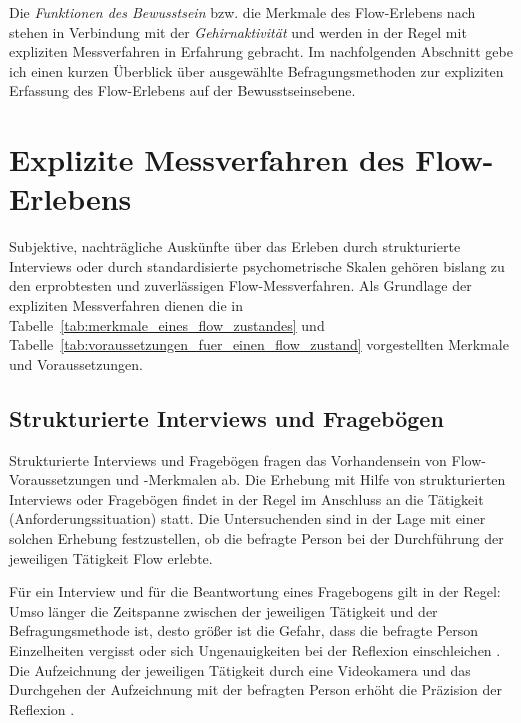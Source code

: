 Die \emph{Funktionen des Bewusstsein} bzw. die Merkmale des Flow-Erlebens nach \citet{Henk2014} stehen in Verbindung mit der \emph{Gehirnaktivität} und werden in der Regel mit expliziten Messverfahren in Erfahrung gebracht. Im nachfolgenden Abschnitt gebe ich einen kurzen Überblick über ausgewählte Befragungsmethoden zur expliziten Erfassung des Flow-Erlebens auf der Bewusstseinsebene. 


\section{Explizite Messverfahren des Flow-Erlebens} %
\label{sec:explizite_messverfahren_des_flow_erlebens}

Subjektive, nachträgliche Auskünfte über das Erleben durch strukturierte Interviews oder durch standardisierte psychometrische Skalen gehören bislang zu den erprobtesten und zuverlässigen Flow-Messverfahren. Als Grundlage der expliziten Messverfahren dienen die in Tabelle~\ref{tab:merkmale_eines_flow_zustandes} und Tabelle~\ref{tab:voraussetzungen_fuer_einen_flow_zustand} vorgestellten Merkmale und Voraussetzungen.

\subsection{Strukturierte Interviews und Fragebögen} %
\label{sub:strukturierte_interviews_und_fragebogen}

Strukturierte Interviews und Fragebögen fragen das Vorhandensein von Flow-Voraussetzungen und -Merkmalen ab. Die Erhebung mit Hilfe von strukturierten Interviews oder Fragebögen findet in der Regel im Anschluss an die Tätigkeit (Anforderungssituation) statt. Die Untersuchenden sind in der Lage mit einer solchen Erhebung festzustellen, ob die befragte Person bei der Durchführung der jeweiligen Tätigkeit Flow erlebte.

Für ein Interview und für die Beantwortung eines Fragebogens gilt in der Regel: Umso länger die Zeitspanne zwischen der jeweiligen Tätigkeit und der Befragungsmethode ist, desto größer ist die Gefahr, dass die befragte Person Einzelheiten vergisst oder sich Ungenauigkeiten bei der Reflexion einschleichen \citep[][S.~87]{Henk2014}. Die Aufzeichnung der jeweiligen Tätigkeit durch eine Videokamera und das Durchgehen der Aufzeichnung mit der befragten Person erhöht die Präzision der Reflexion \citep[Video-Recall, ][S.~566]{Leuchter2006}.

